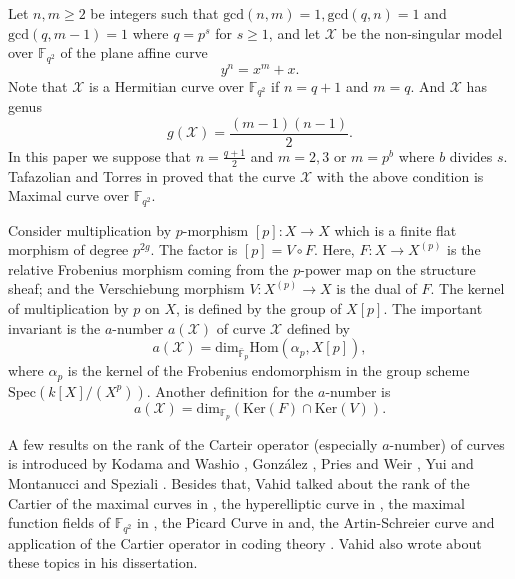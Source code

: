 Let $n,m \geq 2$ be integers such that $\mbox{gcd}(n,m) = 1, \mbox{gcd}(q, n) = 1$ and $\mbox{gcd}(q,m-1) = 1$ where $q = p^s$ for $s \geq 1$, and let $\mathcal{X}$ be the non-singular model over $\mathbb{F}_{q^2}$ of the plane affine curve
 \begin{equation}
y^{n}=x^{m}+x.
 \end{equation}
Note that $\mathcal{X}$ is a Hermitian curve over $\mathbb{F}_{q^2}$ if $n = q +1$ and $m = q$. And $\mathcal{X}$ has genus
 \begin{equation*}
g(\mathcal{X})=\dfrac{(m-1)(n-1)}{2}.
 \end{equation*}
In this paper we suppose that $n =\frac{q+1}{2}$ and $m = 2, 3$ or $m = p^b$ where $b$
divides $s$. Tafazolian and Torres in \cite{tafazol} proved that the curve $\mathcal{X}$ with the above
condition is Maximal curve over $\mathbb{F}_{q^2}$.











 Consider multiplication by $p$-morphism $[p]: X \rightarrow X$ which is a finite flat morphism of degree $p^{2g}$.  The factor is $[p]=V \circ F$. Here, $F: X \rightarrow X^{(p)}$   is the relative Frobenius morphism coming from the $p$-power map on the
structure sheaf; and  the Verschiebung morphism  $V: X^{(p)} \rightarrow X$ is the dual of $F$.  The kernel of multiplication by $p$ on $X$, is defined by the group of $X[p]$.
The important invariant  is the $a$-number $a(\mathcal{X})$ of curve $\mathcal{X}$ defined by
$$a(\mathcal{X})=\mbox{dim}_{\mathbb{\bar{F}}_p} \mbox{Hom}(\alpha_{p}, X[p]),$$
where $\alpha_p$ is the kernel of the Frobenius endomorphism in the group scheme $\mbox{Spec}(k[X]/(X^p))$. Another definition for the $a$-number is
$$ a(\mathcal{X}) = \mbox{dim}_{\mathbb{F}_p}(\mbox{Ker}(F) \cap \mbox{Ker}(V)).$$




 A few results on the rank of the Carteir operator (especially $a$-number) of curves is introduced by Kodama and Washio \cite{13}, González \cite{8}, Pries and Weir \cite{17}, Yui \cite{Yui} and Montanucci and Speziali \cite{maria}. Besides that, Vahid talked about the rank of the Cartier of the maximal curves in \cite{esfahan,aut}, the hyperelliptic curve in \cite{shiraz}, the maximal function fields of $\mathbb{F}_{q^2}$ in \cite{misori,behrooz}, the Picard Curve in \cite{picard} and, the Artin-Schreier curve and application of the Cartier operator in coding theory \cite{vahidd}. Vahid also wrote about these topics in his \cite{phd} dissertation.


